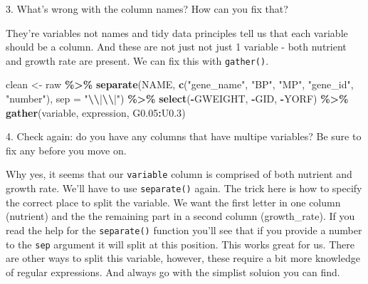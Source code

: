 \documentclass[
]{book}
\newenvironment{Shaded}{\begin{snugshade}}{\end{snugshade}}
\newcommand{\AttributeTok}[1]{\textcolor[rgb]{0.13,0.29,0.53}{#1}}
\newcommand{\FloatTok}[1]{\textcolor[rgb]{0.00,0.00,0.81}{#1}}
\newcommand{\FunctionTok}[1]{\textcolor[rgb]{0.13,0.29,0.53}{\textbf{#1}}}
\newcommand{\NormalTok}[1]{#1}
\newcommand{\OtherTok}[1]{\textcolor[rgb]{0.56,0.35,0.01}{#1}}
\newcommand{\SpecialCharTok}[1]{\textcolor[rgb]{0.81,0.36,0.00}{\textbf{#1}}}
\newcommand{\StringTok}[1]{\textcolor[rgb]{0.31,0.60,0.02}{#1}}
\begin{document}
3. What's wrong with the column names? How can you fix that?

They're variables not names and tidy data principles tell us that each variable should be a column. And these are not just not just 1 variable - both nutrient and growth rate are present. We can fix this with \texttt{gather()}.

\begin{Shaded}
\begin{Highlighting}[]
\NormalTok{clean }\OtherTok{\textless{}{-}}\NormalTok{ raw }\SpecialCharTok{\%\textgreater{}\%}
  \FunctionTok{separate}\NormalTok{(NAME, }\FunctionTok{c}\NormalTok{(}\StringTok{"gene\_name"}\NormalTok{, }\StringTok{"BP"}\NormalTok{, }\StringTok{"MP"}\NormalTok{, }\StringTok{"gene\_id"}\NormalTok{, }\StringTok{"number"}\NormalTok{), }\AttributeTok{sep =} \StringTok{"}\SpecialCharTok{\textbackslash{}\textbackslash{}}\StringTok{|}\SpecialCharTok{\textbackslash{}\textbackslash{}}\StringTok{|"}\NormalTok{) }\SpecialCharTok{\%\textgreater{}\%}
  \FunctionTok{select}\NormalTok{(}\SpecialCharTok{{-}}\NormalTok{GWEIGHT, }\SpecialCharTok{{-}}\NormalTok{GID, }\SpecialCharTok{{-}}\NormalTok{YORF) }\SpecialCharTok{\%\textgreater{}\%}
  \FunctionTok{gather}\NormalTok{(variable, expression, G0}\FloatTok{.05}\SpecialCharTok{:}\NormalTok{U0}\FloatTok{.3}\NormalTok{)}
\end{Highlighting}
\end{Shaded}

4. Check again: do you have any columns that have multipe variables? Be sure to fix any before you move on.

Why yes, it seems that our \texttt{variable} column is comprised of both nutrient and growth rate. We'll have to use \texttt{separate()} again. The trick here is how to specify the correct place to split the variable. We want the first letter in one column (nutrient) and the the remaining part in a second column (growth\_rate). If you read the help for the \texttt{separate()} function you'll see that if you provide a number to the \texttt{sep} argument it will split at this position. This works great for us. There are other ways to split this variable, however, these require a bit more knowledge of regular expressions. And always go with the simplist soluion you can find.
\end{document}

